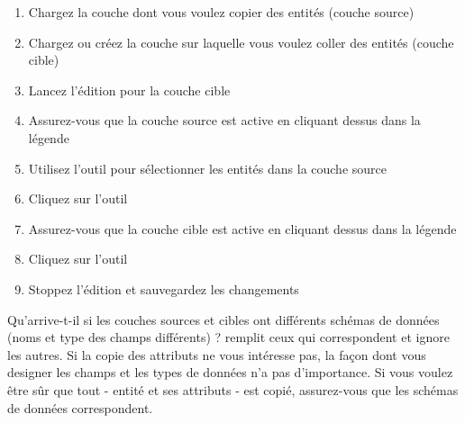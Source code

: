 \begin{enumerate}
\item Chargez la couche dont vous voulez copier des entités (couche source)
\item Chargez ou créez la couche sur laquelle vous voulez coller des entités (couche cible)
\item Lancez l'édition pour la couche cible
\item Assurez-vous que la couche source est active en cliquant dessus dans la légende
\item Utilisez l'outil  pour sélectionner les entités dans la couche source
\item Cliquez sur l'outil 
\item Assurez-vous que la couche cible est active en cliquant dessus dans la légende
\item Cliquez sur l'outil 
\item Stoppez l'édition et sauvegardez les changements
\end{enumerate}

Qu'arrive-t-il si les couches sources et cibles ont différents schémas de données (noms et type des champs différents) ? \qg remplit ceux qui correspondent et ignore les autres. Si la copie des attributs ne vous intéresse pas, la façon dont vous designer les champs et les types de données n'a pas d'importance. Si vous voulez être sûr que tout - entité et ses attributs - est copié, assurez-vous que les schémas de données correspondent.

